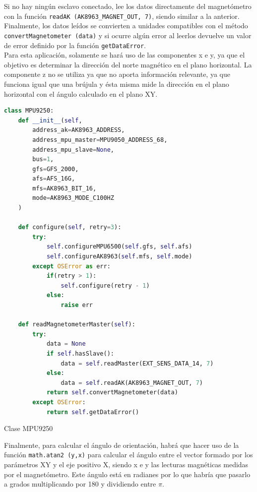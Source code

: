 Si no hay ningún esclavo conectado, lee los datos directamente del magnetómetro con la función \verb|readAK (AK8963_MAGNET_OUT, 7)|, siendo similar a la anterior. Finalmente, los datos leídos se convierten a unidades compatibles con el método \verb|convertMagnetometer (data)| y si ocurre algún error al leerlos devuelve un valor de error definido por la función \verb|getDataError|.\\

Para esta aplicación, solamente se hará uso de las componentes x e y, ya que el objetivo es determinar la dirección del norte magnético en el plano horizontal. La componente z no se utiliza ya que no aporta información relevante, ya que funciona igual que una brújula y ésta misma mide la dirección en el plano horizontal con el ángulo calculado en el plano XY.


\begin{code}[H]
\begin{lstlisting}[language=Python]
class MPU9250:
    def __init__(self, 
        address_ak=AK8963_ADDRESS, 
        address_mpu_master=MPU9050_ADDRESS_68, 
        address_mpu_slave=None, 
        bus=1, 
        gfs=GFS_2000, 
        afs=AFS_16G, 
        mfs=AK8963_BIT_16, 
        mode=AK8963_MODE_C100HZ
    )
       
    def configure(self, retry=3):
        try:
            self.configureMPU6500(self.gfs, self.afs)
            self.configureAK8963(self.mfs, self.mode)
        except OSError as err:
            if(retry > 1):
                self.configure(retry - 1)
            else:
                raise err
     
    def readMagnetometerMaster(self):
        try:
            data = None
            if self.hasSlave():
                data = self.readMaster(EXT_SENS_DATA_14, 7)          
            else:   
                data = self.readAK(AK8963_MAGNET_OUT, 7)
            return self.convertMagnetometer(data)
        except OSError:
            return self.getDataError()           
\end{lstlisting}
\caption[Clase MPU9250]{Clase MPU9250}
\label{cod:codejemplo}
\end{code}


Finalmente, para calcular el ángulo de orientación, habrá que hacer uso de la función \verb|math.atan2 (y,x)| para calcular el ángulo entre el vector formado por los parámetros XY y el eje positivo X, siendo x e y las lecturas magnéticas medidas por el magnetómetro. Este ángulo está en radianes por lo que habría que pasarlo a grados multiplicando por 180 y dividiendo entre \(\pi\).\\

